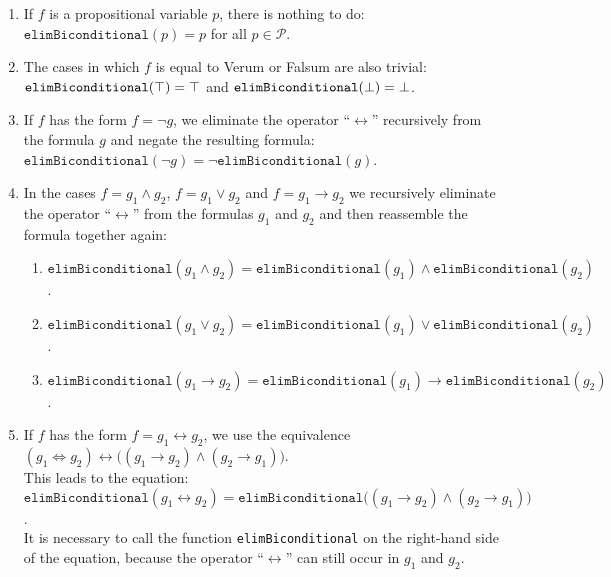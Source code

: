 \begin{enumerate}
\item If $f$ is a propositional variable $p$, there is nothing to do:
      \\[0.2cm]
      \hspace*{1.3cm}
      $\texttt{elimBiconditional}(p) = p$ \quad for all $p \in \mathcal{P}$.
\item The cases in which $f$ is equal to Verum or  Falsum are also trivial:
      \\[0.2cm]
      \hspace*{1.3cm}
      $\texttt{elimBiconditional}(\top) = \top$ \quad and \quad
      $\texttt{elimBiconditional}(\bot) = \bot$.
\item If $f$ has the form $f = \neg g$, we eliminate the operator
      ``$\leftrightarrow$'' recursively from the formula $g$ and negate the resulting formula: \\[0.2cm]
      \hspace*{1.3cm} 
      $\texttt{elimBiconditional}(\neg g) = \neg \texttt{elimBiconditional}(g)$.
\item In the cases $f = g_1 \wedge g_2$, $f = g_1 \vee g_2$ and $f = g_1 \rightarrow g_2$ we 
      recursively eliminate the operator ``$\leftrightarrow$'' from the formulas $g_1$ and $g_2$ and then reassemble the formula
      together again: 
      \begin{enumerate}
      \item $\texttt{elimBiconditional}(g_1 \wedge g_2) = \texttt{elimBiconditional}(g_1) \wedge \texttt{elimBiconditional}(g_2)$.
      \item $\texttt{elimBiconditional}(g_1 \vee g_2) = \texttt{elimBiconditional}(g_1) \vee \texttt{elimBiconditional}(g_2)$.
      \item $\texttt{elimBiconditional}(g_1 \rightarrow g_2) = \texttt{elimBiconditional}(g_1) \rightarrow \texttt{elimBiconditional}(g_2)$.
      \end{enumerate}
\item If $f$ has the form $f = g_1 \leftrightarrow g_2$, we use the
      equivalence \\[0.2cm]
      \hspace*{1.3cm} 
      $(g_1 \Leftrightarrow g_2) \leftrightarrow \bigl( (g_1 \rightarrow g_2) \wedge (g_2 \rightarrow g_1)\bigr)$.
      \\[0.2cm]
      This leads to the equation:
      \\[0.2cm]
      \hspace*{1.3cm} 
      $\texttt{elimBiconditional}(g_1 \leftrightarrow g_2) = \texttt{elimBiconditional}\bigl( (g_1 \rightarrow g_2) \wedge (g_2 \rightarrow g_1)\bigr)$. 
      \\[0.2cm]
      It is necessary to call the function \texttt{elimBiconditional} on the right-hand side of the equation,
      because the operator ``$\leftrightarrow$'' can still occur in $g_1$ and $g_2$.
\end{enumerate}



